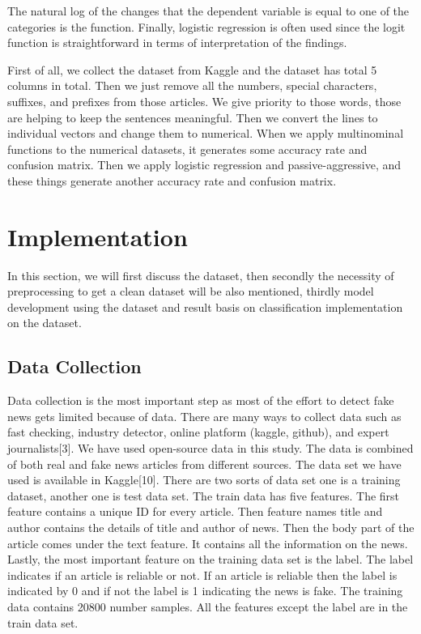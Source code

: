 \documentclass[conference]{IEEEtran}
\begin{document}
The natural log of the changes that the dependent variable is equal to one of the categories is the function. Finally, logistic regression is often used since the logit function is straightforward in terms of interpretation of the findings.

First of all, we collect the dataset from Kaggle and the dataset has total 5 columns in total. Then we just remove all the numbers, special characters, suffixes, and prefixes from those articles. We give priority to those words, those are helping to keep the sentences meaningful. Then we convert the lines to individual vectors and change them to numerical. When we apply multinominal functions to the numerical datasets, it generates some accuracy rate and confusion matrix. Then we apply logistic regression and passive-aggressive, and these things generate another accuracy rate and confusion matrix.


\section{Implementation}
In this section, we will first discuss the dataset, then secondly the necessity of preprocessing to get a clean dataset will be also mentioned, thirdly model development using the dataset and result basis on classification implementation on the dataset.
\subsection{Data Collection}
Data collection is the most important step as most of the effort to detect fake news gets limited because of data. There are many ways to collect data such as fast checking, industry detector, online platform (kaggle, github), and expert journalists[3]. We have used open-source data in this study. The data is combined of both real and fake news articles from different sources. The data set we have used is available in Kaggle[10]. There are two sorts of data set one is a training dataset, another one is test data set. The train data has five features. The first feature contains a unique ID for every article. Then feature names title and author contains the details of title and author of news. Then the body part of the article comes under the text feature. It contains all the information on the news. Lastly, the most important feature on the training data set is the label. The label indicates if an article is reliable or not. If an article is reliable then the label is indicated by 0 and if not the label is 1 indicating the news is fake. The training data contains 20800 number samples. All the features except the label are in the train data set. 
\end{document}
